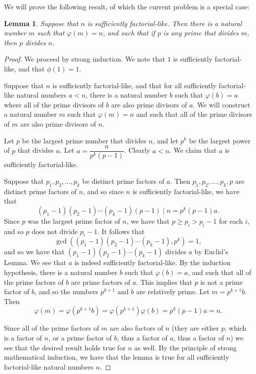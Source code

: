 \documentclass{article}
\newtheorem*{lemma}{Lemma}
\begin{document}
\begin{enumerate}[1.]
We will prove the following result, of which the current problem is a special case:
\begin{lemma}
	Suppose that $n$ is sufficiently factorial-like. Then there is a natural number $m$ such that $\varphi(m) = n$, and such that if $p$ is any prime that divides $m$, then $p$ divides $n$.
\end{lemma}
\begin{proof}
	We proceed by strong induction. We note that $1$ is sufficiently factorial-like, and that $\phi(1) = 1$.

	Suppose that $n$ is sufficiently factorial-like, and that for all sufficiently factorial-like natural numbers $a < n$, there is a natural number $b$ such that $\varphi(b) = a$ where all of the prime divisors of $b$ are also prime divisors of $a$. We will construct a natural number $m$ such that $\varphi(m) = n$ and such that all of the prime divisors of $m$ are also prime divisors of $n$.

	Let $p$ be the largest prime number that divides $n$, and let $p^k$ be the largest power of $p$ that divides $n$. Let $a = \dfrac{n}{p^k(p - 1)}$. Clearly $a < n$. We claim that $a$ is sufficiently factorial-like.

	Suppose that $p_1, p_2, \dots, p_k$ be distinct prime factors of $a$. Then $p_1, p_2, \dots, p_k, p$ are distinct prime factors of $n$, and so since $n$ is sufficiently factorial-like, we have that
	\[
		(p_1 - 1)(p_2 - 1) \dotsb (p_k - 1)(p - 1) \mid n = p^k(p - 1) a.
	\]
	Since $p$ was the largest prime factor of $n$, we have that $p \geq p_i > p_i - 1$ for each $i$, and so $p$ does not divide $p_i - 1$. It follows that
	\[
		\gcd((p_1 - 1)(p_2 - 1) \dotsb (p_k - 1), p^k) = 1,
	\]
	and so we have that $(p_1 - 1)(p_2 - 1) \dotsb (p_k - 1)$ divides $a$ by Euclid's Lemma. We see that $a$ is indeed sufficiently factorial-like. By the induction hypothesis, there is a natural number $b$ such that $\varphi(b) = a$, and such that all of the prime factors of $b$ are prime factors of $a$. This implies that $p$ is not a prime factor of $b$, and so the numbers $p^{k + 1}$ and $b$ are relatively prime. Let $m = p^{k + 1} b$. Then
	\[
		\varphi(m) = \varphi\left(p^{k + 1} b\right) = \varphi\left(p^{k + 1}\right) \varphi(b) = p^k (p - 1) a = n.
	\]

	Since all of the prime factors of $m$ are also factors of $n$ (they are either $p$, which is a factor of $n$, or a prime factor of $b$, thus a factor of $a$, thus a factor of $n$) we see that the desired result holds true for $n$ as well. By the principle of strong mathematical induction, we have that the lemma is true for all sufficiently factorial-like natural numbers $n$.
\end{proof}



\end{enumerate}
\end{document}
